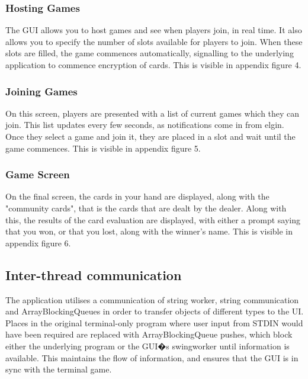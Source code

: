 \documentclass[11pt, oneside]{article}   	%
\begin{document}
\subsubsection{Hosting Games}

The GUI allows you to host games and see when players join, in real time. It also allows you to specify the number of slots available for players to join. When these slots are filled, the game commences automatically, signalling to the underlying application to commence encryption of cards. This is visible in appendix figure 4.

\subsubsection{Joining Games}

On this screen, players are presented with a list of current games which they can join. This list updates every few seconds, as notifications come in from elgin. Once they select a game and join it, they are placed in a slot and wait until the game commences.  This is visible in appendix figure 5. 

\subsubsection{Game Screen}

On the final screen, the cards in your hand are displayed, along with the "community cards", that is the cards that are dealt by the dealer. Along with this, the results of the card evaluation are displayed, with either a prompt saying that you won, or that you lost, along with the winner's name. This is visible in appendix figure 6.

\subsection {Inter-thread communication}

The application utilises a communication of string worker, string communication and ArrayBlockingQueues in order to transfer objects of different types to the UI. Places in the original terminal-only program where user input from STDIN would have been required are replaced with ArrayBlockingQueue pushes, which block either the underlying program or the GUI�s swingworker until information is available. This maintains the flow of information, and ensures that the GUI is in sync with the terminal game.\\
\end{document}
